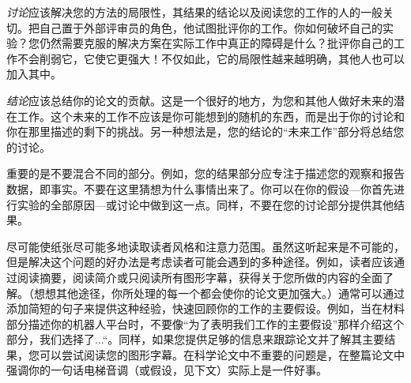 
\emph{讨论}应该解决您的方法的局限性，其结果的结论以及阅读您的工作的人的一般关切。把自己置于外部评审员的角色，他试图批评你的工作。你如何破坏自己的实验？您仍然需要克服的解决方案在实际工作中真正的障碍是什么？批评你自己的工作不会削弱它，它使它更强大！不仅如此，它的局限性越来越明确，其他人也可以加入其中。

\emph{结论}应该总结你的论文的贡献。这是一个很好的地方，为您和其他人做好未来的潜在工作。这个未来的工作不应该是你可能想到的随机的东西，而是出于你的讨论和你在那里描述的剩下的挑战。另一种想法是，您的结论的“未来工作”部分将总结您的讨论。

重要的是不要混合不同的部分。例如，您的结果部分应专注于描述您的观察和报告数据，即事实。不要在这里猜想为什么事情出来了。你可以在你的假设---你首先进行实验的全部原因---或讨论中做到这一点。同样，不要在您的讨论部分提供其他结果。

尽可能使纸张尽可能多地读取读者风格和注意力范围。虽然这听起来是不可能的，但是解决这个问题的好办法是考虑读者可能会遇到的多种途径。例如，读者应该通过阅读摘要，阅读简介或只阅读所有图形字幕，获得关于您所做的内容的全面了解。（想想其他途径，你所处理的每一个都会使你的论文更加强大。）通常可以通过添加简短的句子来提供这种经验，快速回顾你的工作的主要假设。例如，当在材料部分描述你的机器人平台时，不要像“为了表明我们工作的主要假设”那样介绍这个部分，我们选择了...“。同样，如果您提供足够的信息来跟踪论文并了解其主要结果，您可以尝试阅读您的图形字幕。在科学论文中不重要的问题是，在整篇论文中强调你的一句话电梯音调（或假设，见下文）实际上是一件好事。

